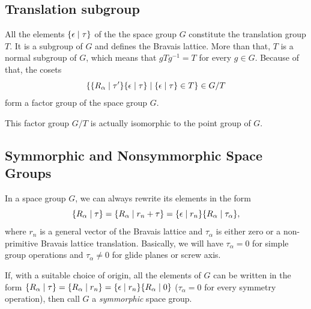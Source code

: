 \subsection{Translation subgroup}

All the elements $\{ \epsilon \mid \tau \}$ of the the space group $G$ constitute the translation group $T$. It is a subgroup of $G$ and defines the Bravais lattice. More than that, $T$ is a normal subgroup of $G$, which means that $g T g^{-1} = T$ for every $g \in G$. Because of that, the cosets
$$
\{ \{ R_\alpha \mid \tau' \} \{ \epsilon \mid \tau \} \mid \{ \epsilon \mid \tau \} \in T \} \in G/T
$$
form a factor group of the space group $G$.

This factor group $G/T$ is actually isomorphic to the point group of $G$.

\subsection{Symmorphic and Nonsymmorphic Space Groups} \label{sec:symmorphic_groups}

In a space group $G$, we can always rewrite its elements in the form
$$
\{ R_\alpha \mid \tau \} = \{ R_\alpha \mid r_n + \tau \} = \{ \epsilon \mid r_n \} \{ R_\alpha \mid \tau_\alpha \},
$$
where $r_n$ is a general vector of the Bravais lattice and $\tau_\alpha$ is either zero or a non-primitive Bravais lattice translation. Basically, we will have $\tau_\alpha = 0$ for simple group operations and $\tau_\alpha \neq 0$ for glide planes or screw axis.

If, with a suitable choice of origin, all the elements of $G$ can be written in the form $\{ R_\alpha \mid \tau \} = \{ R_\alpha \mid r_n \} = \{ \epsilon \mid r_n \} \{ R_\alpha \mid 0 \}$ ($\tau_\alpha = 0$ for every symmetry operation), then call $G$ a \textit{symmorphic} space group.


